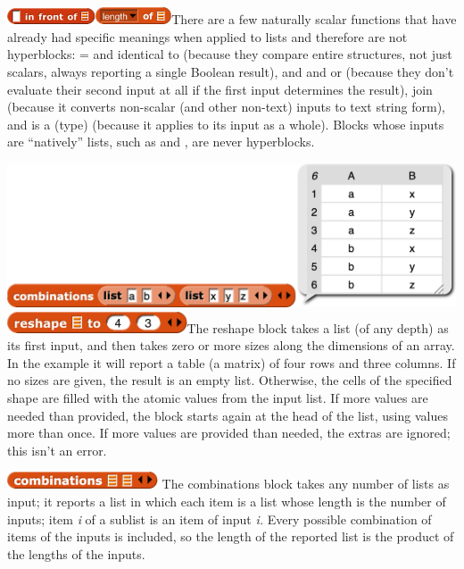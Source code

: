 \includegraphics[width=1.02986in,height=0.18958in]{media/image621.png}\includegraphics[width=0.88958in,height=0.2in]{media/image193.png}There
are a few naturally scalar functions that have already had specific
meanings when applied to lists and therefore are not hyperblocks: = and
identical to (because they compare entire structures, not just scalars,
always reporting a single Boolean result), and and or (because they
don't evaluate their second input at all if the first input determines
the result), join (because it converts non-scalar (and other non-text)
inputs to text string form), and is a (type) (because it applies to its
input as a whole). Blocks whose inputs are ``natively'' lists, such as
and , are never hyperblocks.

\includegraphics[width=5.23958in,height=1.67986in]{media/image622.png}\includegraphics[width=2.09917in,height=0.2475in]{media/image205.png}The
reshape block takes a list (of any depth) as its first input, and then
takes zero or more sizes along the dimensions of an array. In the
example it will report a table (a matrix) of four rows and three
columns. If no sizes are given, the result is an empty list. Otherwise,
the cells of the specified shape are filled with the atomic values from
the input list. If more values are needed than provided, the block
starts again at the head of the list, using values more than once. If
more values are provided than needed, the extras are ignored; this isn't
an error.

\includegraphics[width=1.76in,height=0.2in]{media/image203.png} The
combinations block takes any number of lists as input; it reports a list
in which each item is a list whose length is the number of inputs; item
\emph{i} of a sublist is an item of input \emph{i.} Every possible
combination of items of the inputs is included, so the length of the
reported list is the product of the lengths of the inputs.


